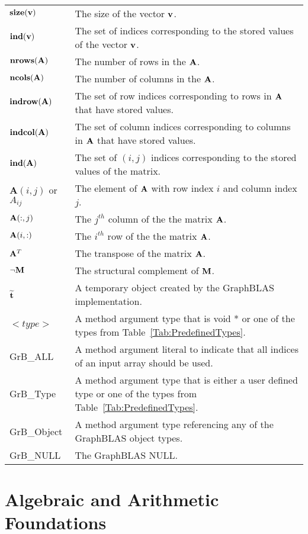 \begin{tabular}[H]{l|p{5in}}
$\mathbf{size}({\bf v})$ & The size of the vector ${\bf v}$.\\
$\mathbf{ind}({\bf v})$ & The set of indices corresponding to the stored values of the vector ${\bf v}$.\\
$\mathbf{nrows}({\bf A})$ & The number of rows in the ${\bf A}$.\\
$\mathbf{ncols}({\bf A})$ & The number of columns in the ${\bf A}$.\\
$\mathbf{indrow}({\bf A})$ & The set of row indices corresponding to rows in ${\bf A}$ that have stored values.  \\
$\mathbf{indcol}({\bf A})$ & The set of column indices corresponding to columns in ${\bf A}$ that have stored values. \\
$\mathbf{ind}({\bf A})$ & The set of $(i,j)$ indices corresponding to the stored values of the matrix. \\
$\mathbf{A}(i,j)$ or $A_{ij}$ & The element of ${\bf A}$ with row index $i$ and column index $j$.\\
${\bf A}(:,j)$ & The $j^{th}$ column of the the matrix ${\bf A}$.\\
${\bf A}(i,:)$ & The $i^{th}$ row of the the matrix ${\bf A}$.\\
${\bf A}^T$ &The transpose of the matrix ${\bf A}$. \\
$\neg{\bf M}$ & The structural complement of ${\bf M}$.\\
${\bf \widetilde{t}}$ & A temporary object created  by the GraphBLAS implementation. \\
$<type>$ & A method argument type that is {\sf void *} or one of the types from Table~\ref{Tab:PredefinedTypes}. \\
{\sf GrB\_ALL} & A method argument literal to indicate that all indices of an input array should be used.\\
{\sf GrB\_Type} & A method argument type that is either a user defined type or one of the  types from Table~\ref{Tab:PredefinedTypes}.\\
{\sf GrB\_Object} &  A method argument type referencing any of the GraphBLAS object types.\\
{\sf GrB\_NULL} & The GraphBLAS NULL.\\
\end{tabular}

\restoregeometry


\section{Algebraic and Arithmetic Foundations}

